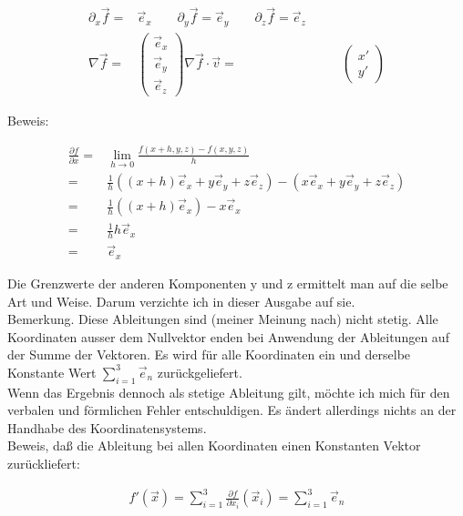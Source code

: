 \documentclass[a4paper]{article}
\begin{document}
\begin{displaymath}
\begin{align}
\partial_{x}\vec{f} =& \vec{e}_{x}\qquad
\partial_{y}\vec{f} = \vec{e}_{y}\qquad
\partial_{z}\vec{f} = \vec{e}_{z}\qquad\\
\nabla\vec{f} =& \begin{pmatrix}\vec{e}_{x}\\\vec{e}_{y}\\\vec{e}_{z}\end{pmatrix}
\nabla\vec{f}\cdot\vec{v} =& \begin{pmatrix}x'\\y'\end{pmatrix}
\end{align}
\end{displaymath}

Beweis:

\begin{displaymath}
\begin{align}
    \frac{\partial f}{\partial x} =& \lim_{h\rightarrow 0}\frac{f(x+h,y,z)-f(x,y,z)}{h}\\
    =& \frac{1}{h}((x+h)\vec{e}_x + y\vec{e}_y + z\vec{e}_z) - (x\vec{e}_x + y\vec{e}_y + z\vec{e}_z)\\
    =& \frac{1}{h}((x+h)\vec{e}_x) - x\vec{e}_x \\
    =& \frac{1}{h}h\vec{e}_x\\
    =& \vec{e}_x
\end{align}
\end{displaymath}

Die Grenzwerte der anderen Komponenten y und z ermittelt man auf die selbe Art und Weise. Darum verzichte ich in dieser Ausgabe auf sie.\\

Bemerkung. Diese Ableitungen sind (meiner Meinung nach) nicht stetig. Alle Koordinaten ausser dem Nullvektor enden bei Anwendung der Ableitungen auf der Summe der Vektoren. Es wird für alle Koordinaten ein und derselbe Konstante Wert $\sum_{i=1}^{3}\vec{e}_{n}$ zurückgeliefert.\\
Wenn das Ergebnis dennoch als stetige Ableitung gilt, m\"ochte ich mich f\"ur den verbalen und f\"ormlichen Fehler entschuldigen. Es \"andert allerdings nichts an der Handhabe des Koordinatensystems.\\


Beweis, daß die Ableitung bei allen Koordinaten einen Konstanten Vektor zurückliefert:

\begin{displaymath}
\begin{align}
f'(\vec{x}) = \sum_{i=1}^{3}\frac{\partial f}{\partial x_i}(\vec{x}_i) = \sum_{i=1}^{3}\vec{e}_{n}
\end{align}
\end{displaymath}
\end{document}
